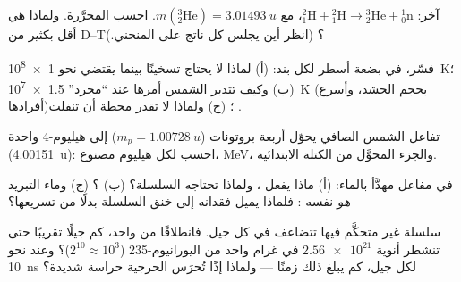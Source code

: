 \begin{exercise}[$\star\star$]\label{exo:g12:nuclear-energy:8}
 آخر: ${}^{2}_{1}\mathrm{H} + {}^{2}_{1}\mathrm{H} \to
{}^{3}_{2}\mathrm{He} + {}^{1}_{0}\mathrm{n}$، مع
$m({}^{3}_{2}\mathrm{He}) = \qty{3.01493}{u}$. احسب  المحرَّرة.
ولماذا هي أقل بكثير من D--T؟ (انظر أين يجلس كل ناتج على المنحني.)
\end{exercise}

\begin{exercise}[$\star\star$]\label{exo:g12:nuclear-energy:9}
فسّر، في بضعة أسطر لكل بند: (أ) لماذا لا يحتاج  تسخينًا بينما يقتضي 
نحو \qty{1e8}{K}؛ (ب) وكيف تتدبر الشمس أمرها عند ``مجرد'' \qty{1.5e7}{K}
(بحجم الحشد، وأسرع أفرادها)؛ (ج) ولماذا لا تقدر محطة  أن تنفلت
.
\end{exercise}

\begin{exercise}[$\star\star$]\label{exo:g12:nuclear-energy:10}
تفاعل الشمس الصافي يحوّل أربعة بروتونات ($m_p = \qty{1.00728}{u}$) إلى 
هيليوم-4 واحدة (\qty{4.00151}{u}): احسب  لكل هيليوم مصنوع، 
\unit{MeV}، والجزء المحوَّل من الكتلة الابتدائية.
\end{exercise}

\begin{exercise}[$\star\star$]\label{exo:g12:nuclear-energy:11}
في مفاعل مهدَّأ بالماء: (أ) ماذا يفعل ، ولماذا تحتاجه
السلسلة؟ (ب) ؟ (ج) وماء التبريد \emph{هو} نفسه
: فلماذا يميل فقدانه إلى خنق السلسلة بدلًا من تسريعها؟
\end{exercise}

\begin{exercise}[$\star\star\star$]\label{exo:g12:nuclear-energy:12}
سلسلة غير متحكَّم فيها تتضاعف في كل جيل. فانطلاقًا من  واحد، كم
جيلًا تقريبًا حتى تنشطر أنوية $\num{2.56e21}$ في غرام واحد من اليورانيوم-235
($2^{10} \approx 10^{3}$)؟ وعند نحو \qty{10}{ns} لكل جيل،
كم يبلغ ذلك زمنًا --- ولماذا إذًا تُحرَس الحرجية حراسة شديدة؟
\end{exercise}

